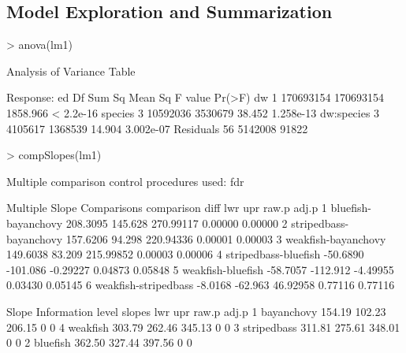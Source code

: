 \documentclass[a4paper]{article}
\begin{document}
\subsection{Model Exploration and Summarization}
\begin{Schunk}
\begin{Sinput}
> anova(lm1)
\end{Sinput}
\begin{Soutput}
Analysis of Variance Table

Response: ed
           Df    Sum Sq   Mean Sq  F value    Pr(>F)
dw          1 170693154 170693154 1858.966 < 2.2e-16
species     3  10592036   3530679   38.452 1.258e-13
dw:species  3   4105617   1368539   14.904 3.002e-07
Residuals  56   5142008     91822                   
\end{Soutput}
\begin{Sinput}
> compSlopes(lm1)
\end{Sinput}
\begin{Soutput}
Multiple comparison control procedures used: fdr 

Multiple Slope Comparisons
              comparison     diff      lwr       upr   raw.p   adj.p
1    bluefish-bayanchovy 208.3095  145.628 270.99117 0.00000 0.00000
2 stripedbass-bayanchovy 157.6206   94.298 220.94336 0.00001 0.00003
3    weakfish-bayanchovy 149.6038   83.209 215.99852 0.00003 0.00006
4   stripedbass-bluefish -50.6890 -101.086  -0.29227 0.04873 0.05848
5      weakfish-bluefish -58.7057 -112.912  -4.49955 0.03430 0.05145
6   weakfish-stripedbass  -8.0168  -62.963  46.92958 0.77116 0.77116

Slope Information
        level slopes    lwr    upr raw.p adj.p
1  bayanchovy 154.19 102.23 206.15     0     0
4    weakfish 303.79 262.46 345.13     0     0
3 stripedbass 311.81 275.61 348.01     0     0
2    bluefish 362.50 327.44 397.56     0     0
\end{Soutput}
\end{Schunk}
\end{document}
